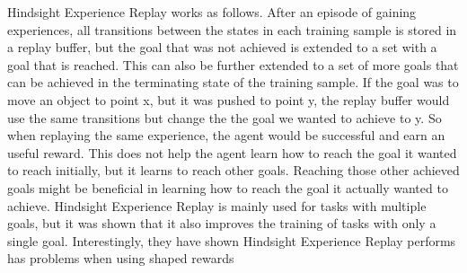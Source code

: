 \vspace{0.5cm}

Hindsight Experience Replay works as follows. After an episode of gaining experiences, all transitions between the states in each training sample is stored in a replay buffer, but the goal that was not achieved is extended to a set with a goal that is reached. This can also be further extended to a set of more goals that can be achieved in the terminating state of the training sample. If the goal was to move an object to point x, but it was pushed to point y, the replay buffer would use the same transitions but change the the goal we wanted to achieve to y. So when replaying the same experience, the agent would be successful and earn an useful reward. This does not help the agent learn how to reach the goal it wanted to reach initially, but it learns to reach other goals. Reaching those other achieved goals might be beneficial in learning how to reach the goal it actually wanted to achieve. Hindsight Experience Replay is mainly used for tasks with multiple goals, but it was shown that it also improves the training of tasks with only a single goal. 
Interestingly, they have shown Hindsight Experience Replay performs has problems when using shaped rewards
 

